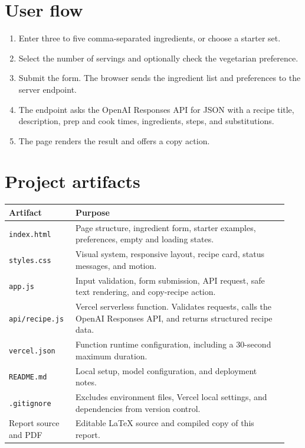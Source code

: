 \documentclass[11pt]{article}
\begin{document}
\section{User flow}
\begin{enumerate}[leftmargin=1.5em,itemsep=5pt]
  \item Enter three to five comma-separated ingredients, or choose a starter set.
  \item Select the number of servings and optionally check the vegetarian preference.
  \item Submit the form. The browser sends the ingredient list and preferences to the server endpoint.
  \item The endpoint asks the OpenAI Responses API for JSON with a recipe title, description, prep and cook times, ingredients, steps, and substitutions.
  \item The page renders the result and offers a copy action.
\end{enumerate}

\section{Project artifacts}
\begin{center}
\begin{tabular}{@{}p{0.22\linewidth}p{0.72\linewidth}@{}}
\toprule
\textbf{Artifact} & \textbf{Purpose} \\
\midrule
\texttt{index.html} & Page structure, ingredient form, starter examples, preferences, empty and loading states. \\
\texttt{styles.css} & Visual system, responsive layout, recipe card, status messages, and motion. \\
\texttt{app.js} & Input validation, form submission, API request, safe text rendering, and copy-recipe action. \\
\texttt{api/recipe.js} & Vercel serverless function. Validates requests, calls the OpenAI Responses API, and returns structured recipe data. \\
\texttt{vercel.json} & Function runtime configuration, including a 30-second maximum duration. \\
\texttt{README.md} & Local setup, model configuration, and deployment notes. \\
\texttt{.gitignore} & Excludes environment files, Vercel local settings, and dependencies from version control. \\
Report source and PDF & Editable LaTeX source and compiled copy of this report. \\
\bottomrule
\end{tabular}
\end{center}
\end{document}
